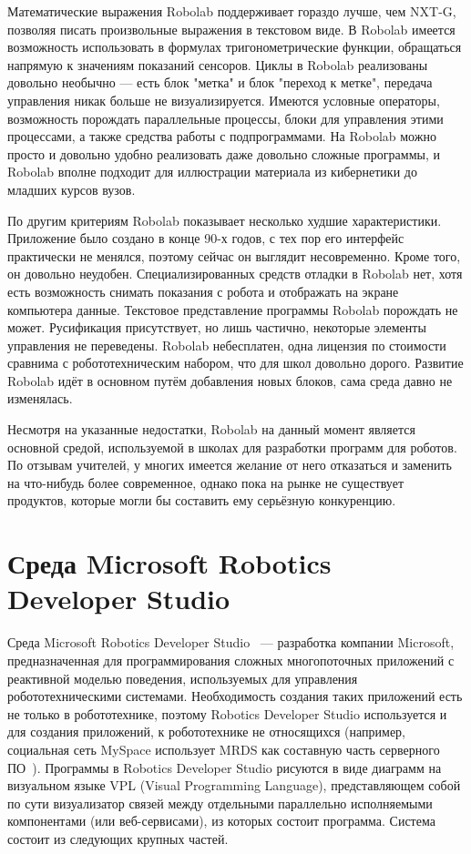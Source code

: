\documentclass[a4paper]{article}
\begin{document}
Математические выражения Robolab поддерживает гораздо лучше, чем NXT-G, позволяя писать произвольные выражения в текстовом виде. В Robolab имеется возможность использовать в формулах тригонометрические функции, обращаться напрямую к значениям показаний сенсоров. Циклы в Robolab реализованы довольно необычно --- есть блок "метка" и блок "переход к метке", передача управления никак больше не визуализируется. Имеются условные операторы, возможность порождать параллельные процессы, блоки для управления этими процессами, а также средства работы с подпрограммами. На Robolab можно просто и довольно удобно реализовать даже довольно сложные программы, и Robolab вполне подходит для иллюстрации материала из кибернетики до младших курсов вузов.

По другим критериям Robolab показывает несколько худшие характеристики. Приложение было создано в конце 90-х годов, с тех пор его интерфейс практически не менялся, поэтому сейчас он выглядит несовременно. Кроме того, он довольно неудобен. Специализированных средств отладки в Robolab нет, хотя есть возможность снимать показания с робота и отображать на экране компьютера данные. Текстовое представление программы Robolab порождать не может. Русификация присутствует, но лишь частично, некоторые элементы управления не переведены. Robolab небесплатен, одна лицензия по стоимости сравнима с робототехническим набором, что для школ довольно дорого. Развитие Robolab идёт в основном путём добавления новых блоков, сама среда давно не изменялась.

Несмотря на указанные недостатки, Robolab на данный момент является основной средой, используемой в школах для разработки программ для роботов. По отзывам учителей, у многих имеется желание от него отказаться и заменить на что-нибудь более современное, однако пока на рынке не существует продуктов, которые могли бы составить ему серьёзную конкуренцию.

\section{Среда Microsoft Robotics Developer Studio}
Среда Microsoft Robotics Developer Studio~\cite{mrds} --- разработка компании Microsoft, предназначенная для программирования сложных многопоточных приложений с реактивной моделью поведения, используемых для управления робототехническими системами. Необходимость создания таких приложений есть не только в робототехнике, поэтому Robotics Developer Studio используется и для создания приложений, к робототехнике не относящихся (например, социальная сеть MySpace использует MRDS как составную часть серверного ПО~\cite{mrdsAtMySpace}). Программы в Robotics Developer Studio рисуются в виде диаграмм на визуальном языке VPL (Visual Programming Language), представляющем собой по сути визуализатор связей между отдельными параллельно исполняемыми компонентами (или веб-сервисами), из которых состоит программа. Система состоит из следующих крупных частей.
\end{document}
